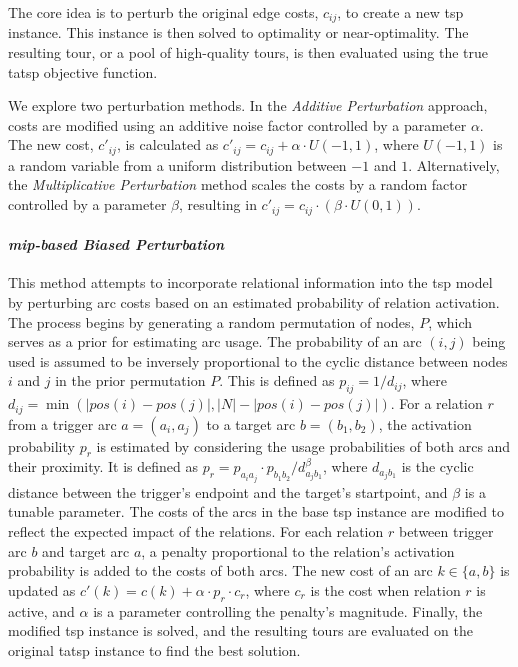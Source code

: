\documentclass[twocolumn, switch]{article} %
\begin{document}
The core idea is to perturb the original edge costs, $c_{ij}$, to create a new \gls{tsp} instance.
This instance is then solved to optimality or near-optimality. The resulting tour, or a pool of high-quality tours, is then evaluated using the true \gls{tatsp} objective function.

We explore two perturbation methods. In the \textit{Additive Perturbation} approach, costs are modified using an additive noise factor controlled by a parameter $\alpha$. The new cost, $c'_{ij}$, is calculated as $c'_{ij} = c_{ij} + \alpha \cdot U(-1, 1)$, where $U(-1, 1)$ is a random variable from a uniform distribution between $-1$ and $1$. Alternatively, the \textit{Multiplicative Perturbation} method scales the costs by a random factor controlled by a parameter $\beta$, resulting in $c'_{ij} = c_{ij} \cdot (\beta \cdot U(0, 1))$.

\paragraph{\textit{\gls{mip}-based Biased Perturbation}}
This method attempts to incorporate relational information into the \gls{tsp} model by perturbing arc costs based on an estimated probability of relation activation. The process begins by generating a random permutation of nodes, $P$, which serves as a prior for estimating arc usage. The probability of an arc $(i, j)$ being used is assumed to be inversely proportional to the cyclic distance between nodes $i$ and $j$ in the prior permutation $P$. This is defined as $p_{ij} = 1/d_{ij}$, where $d_{ij} = \min(|pos(i)-pos(j)|, |N| - |pos(i)-pos(j)|)$. For a relation $r$ from a trigger arc $a=(a_i, a_j)$ to a target arc $b=(b_1, b_2)$, the activation probability $p_r$ is estimated by considering the usage probabilities of both arcs and their proximity. It is defined as $p_r = p_{a_ia_j} \cdot p_{b_1b_2} / d_{a_jb_1}^\beta$, where $d_{a_jb_1}$ is the cyclic distance between the trigger's endpoint and the target's startpoint, and $\beta$ is a tunable parameter. The costs of the arcs in the base \gls{tsp} instance are modified to reflect the expected impact of the relations. For each relation $r$ between trigger arc $b$ and target arc $a$, a penalty proportional to the relation's activation probability is added to the costs of both arcs. The new cost of an arc $k \in \{a,b\}$ is updated as $c'(k) = c(k) + \alpha \cdot p_r \cdot c_r$, where $c_r$ is the cost when relation $r$ is active, and $\alpha$ is a parameter controlling the penalty's magnitude. Finally, the modified \gls{tsp} instance is solved, and the resulting tours are evaluated on the original \gls{tatsp} instance to find the best solution.
\end{document}
